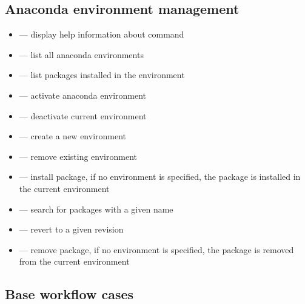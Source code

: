 \documentclass[12pt]{article}
\begin{document}
\subsection{Anaconda environment management}
\begin{itemize}
  \item {} --- display help information about command
  \item {} --- list all anaconda environments
  \item {} --- list packages installed in the environment
  \item {} --- activate anaconda environment
  \item {} --- deactivate current environment
  \item {} --- create a new environment
  \item {} --- remove existing environment
  \item {} --- install package, if no environment is specified, the package is installed in the current environment
  \item {} --- search for packages with a given name
  \item {} --- revert to a given revision
  \item {} --- remove package, if no environment is specified, the package is removed from the current environment
\end{itemize}

\subsection{Base workflow cases}
\end{document}
